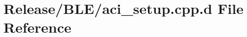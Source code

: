 \hypertarget{_release_2_b_l_e_2aci__setup_8cpp_8d}{\section{\-Release/\-B\-L\-E/aci\-\_\-setup.cpp.\-d \-File \-Reference}
\label{_release_2_b_l_e_2aci__setup_8cpp_8d}
}
